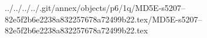../../../../.git/annex/objects/p6/1q/MD5E-s5207--82e5f2b6e2238a832257678a72499b22.tex/MD5E-s5207--82e5f2b6e2238a832257678a72499b22.tex
